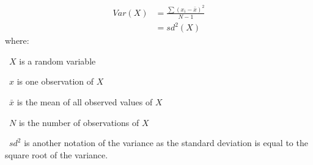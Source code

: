 \begin{equation}\label{eq:variance}
    \tag{Variance}
    \begin{split}
        Var(X) & =  \frac{\sum{(x_{i}-\bar{x})^{2}}}{N-1} \\ & = sd^{2}(X)
    \end{split}
\end{equation}
where:
\quad\begin{eqlist}
    \item[\textbullet\ $X$] is a random variable
    \item[\textbullet\ $x$] is one observation of $X$
    \item[\textbullet\ $\bar{x}$] is the mean of all observed values of $X$
    \item[\textbullet\ $N$] is the number of observations of $X$
    \item[\textbullet\ $sd^2$] is another notation of the variance as
           the standard deviation is equal to the square root of the variance.
\end{eqlist}
